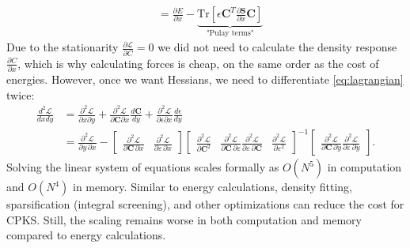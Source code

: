 \documentclass[pdflatex,sn-mathphys-num]{sn-jnl}%
\theoremstyle{thmstyleone}%
\theoremstyle{thmstyletwo}%
\theoremstyle{thmstylethree}%
\begin{document}
\begin{appendices}
\begin{align}
    &= \frac{\partial E}{\partial x}  -\underbrace{\text{Tr}\left[\epsilon \mathbf{C}^T \frac{\partial \mathbf{S}}{\partial x} \mathbf{C}\right]}_\text{"Pulay terms"} \label{eq:analytic_grad}
\end{align}
Due to the stationarity $\frac{\partial \mathcal{L}}{\partial C} = 0$ we did not need to calculate the density response $\frac{\partial C}{\partial x}$, which is why calculating forces is cheap, on the same order as the cost of energies. However, once we want Hessians, we need to differentiate \eqref{eq:lagrangian} twice:
\begin{align}
    \frac{d^2 \mathcal{L}}{dx dy} &= \frac{\partial^2 \mathcal{L}}{\partial x \partial y} + \frac{\partial^2 \mathcal{L}}{\partial \mathbf{C} \partial x} \frac{d \mathbf{C}}{d y} + \frac{\partial^2 \mathcal{L}}{\partial \epsilon \partial x}\frac{d \epsilon}{dy} \\
    &=  \frac{\partial^2 \mathcal L}{\partial y\,\partial x}
-\begin{bmatrix}
\displaystyle \frac{\partial^2 \mathcal L}{\partial \mathbf{C}\,\partial x} &
\displaystyle \frac{\partial^2 \mathcal L}{\partial \varepsilon\,\partial x}
\end{bmatrix}
\begin{bmatrix}
\displaystyle \frac{\partial^2 \mathcal L}{\partial \mathbf{C}^2} & \displaystyle \frac{\partial^2 \mathcal L}{\partial \mathbf{C}\,\partial \varepsilon} 
\displaystyle \frac{\partial^2 \mathcal L}{\partial \varepsilon\,\partial \mathbf{C}} & \displaystyle \frac{\partial^2 \mathcal L}{\partial \varepsilon^2}
\end{bmatrix}^{-1}
\begin{bmatrix}
\displaystyle \frac{\partial^2 \mathcal L}{\partial \mathbf{C}\,\partial y} 
\displaystyle \frac{\partial^2 \mathcal L}{\partial \varepsilon\,\partial y}
\end{bmatrix}.
\end{align}
Solving the linear system of equations scales formally as $O(N^5)$ in computation and $O(N^4)$ in memory. Similar to energy calculations, density fitting, sparsification (integral screening), and other optimizations can reduce the cost for CPKS. Still, the scaling remains worse in both computation and memory compared to energy calculations. 


\end{appendices}
\end{document}
